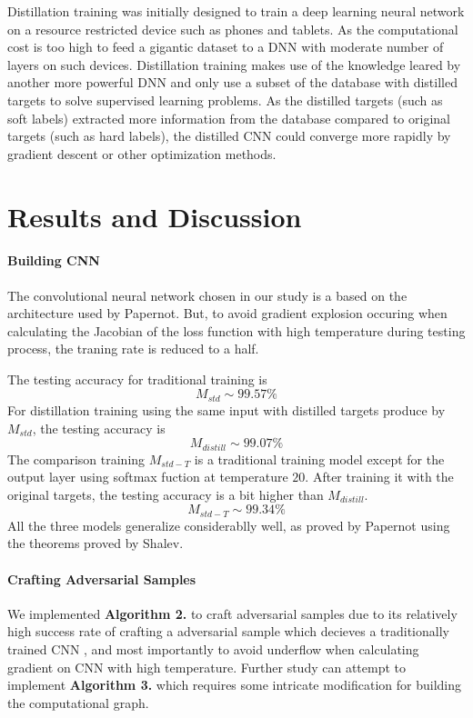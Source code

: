 \documentclass{article}
\begin{document}
Distillation training was initially designed to train a deep learning neural network on a resource restricted device such as phones and tablets. As the computational cost is too high to feed a gigantic dataset to a DNN with moderate number of layers on such devices. 
Distillation training makes use of the knowledge leared by another more powerful DNN and only use a subset of the database with distilled targets to solve supervised learning problems.
As the distilled targets (such as soft labels) extracted more information from the database compared to original targets (such as hard labels), the distilled CNN could converge more rapidly by gradient descent or other optimization methods.

\section{Results and Discussion}

\paragraph{Building CNN}The convolutional neural network chosen in our study is a based on the architecture used by Papernot\cite{Papernot}.
 But, to avoid gradient explosion occuring when calculating the Jacobian of the loss function with high temperature during testing process, the traning rate is reduced to a half.

The testing accuracy for traditional training is \\
\begin{equation}
M_{std} \sim  99.57\%
\end{equation}
For distillation training using the same input with distilled targets produce by $M_{std}$, the testing accuracy is \\
\begin{equation}
M_{distill} \sim 99.07\%
\end{equation}
The comparison training $M_{std-T}$ is a traditional training model except for the output layer using softmax fuction at temperature $20$. After training it with the original targets, the testing accuracy is a bit higher than $M_{distill}$.
\begin{equation}
M_{std-T} \sim 99.34 \%
\end{equation}
All the three models generalize considerablly well, as proved by Papernot\cite{Papernot} using the theorems proved by Shalev\cite{Shalev}.

\paragraph{Crafting Adversarial Samples}
We implemented \textbf{Algorithm 2.} to craft adversarial samples due to its relatively high success rate of crafting a adversarial sample which decieves a traditionally trained CNN , and most importantly to avoid underflow when calculating gradient on CNN with high temperature. Further study can attempt to implement \textbf{Algorithm 3.} which requires some intricate modification for building the computational graph.
\end{document}
